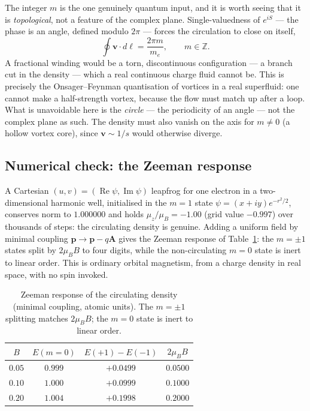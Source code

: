 The integer $m$ is the one genuinely quantum input, and it is worth seeing that it is \emph{topological}, not a
feature of the complex plane. Single-valuedness of $e^{iS}$ --- the phase is an angle, defined modulo $2\pi$ ---
forces the circulation to close on itself,
\begin{equation}
\oint \mathbf{v}\cdot d\boldsymbol{\ell} = \frac{2\pi m}{m_e}, \qquad m\in\mathbb{Z} .
\label{eq:ms-circ}
\end{equation}
A fractional winding would be a torn, discontinuous configuration --- a branch cut in the density --- which a real
continuous charge fluid cannot be. This is precisely the Onsager--Feynman quantisation of vortices in a real
superfluid: one cannot make a half-strength vortex, because the flow must match up after a loop. What is
unavoidable here is the \emph{circle} --- the periodicity of an angle --- not the complex plane as such. The
density must also vanish on the axis for $m\neq 0$ (a hollow vortex core), since $\mathbf{v}\sim 1/s$ would
otherwise diverge.

\subsection*{Numerical check: the Zeeman response}

A Cartesian $(u,v) = (\operatorname{Re}\psi, \operatorname{Im}\psi)$ leapfrog for one electron in a
two-dimensional harmonic well, initialised in the $m = 1$ state $\psi = (x+iy)e^{-r^2/2}$, conserves norm to
$1.000000$ and holds $\mu_z/\mu_B = -1.00$ (grid value $-0.997$) over thousands of steps: the circulating density
is genuine. Adding a uniform field by minimal coupling $\mathbf{p}\to\mathbf{p} - q\mathbf{A}$ gives the Zeeman
response of Table~\ref{tab:ms-zeeman}: the $m = \pm 1$ states split by $2\mu_B B$ to four digits, while the
non-circulating $m = 0$ state is inert to linear order. This is ordinary orbital magnetism, from a charge density
in real space, with no spin invoked.

\begin{table}[h]
\centering
\begin{tabular}{cccc}
\toprule
$B$ & $E(m{=}0)$ & $E(+1)-E(-1)$ & $2\mu_B B$ \\
\midrule
$0.05$ & $0.999$ & $+0.0499$ & $0.0500$ \\
$0.10$ & $1.000$ & $+0.0999$ & $0.1000$ \\
$0.20$ & $1.004$ & $+0.1998$ & $0.2000$ \\
\bottomrule
\end{tabular}
\caption{Zeeman response of the circulating density (minimal coupling, atomic units). The $m = \pm 1$ splitting
matches $2\mu_B B$; the $m = 0$ state is inert to linear order.}
\label{tab:ms-zeeman}
\end{table}

